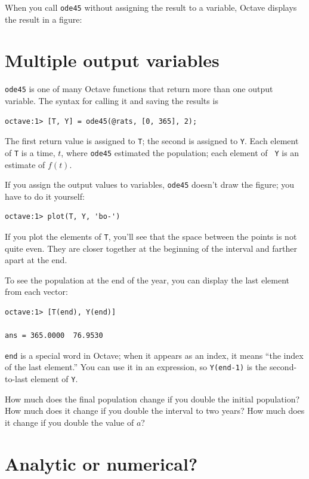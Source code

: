 
When you call {\tt ode45} without assigning the result to a variable,
Octave displays the result in a figure:

\section{Multiple output variables}
\label{rats}

{\tt ode45} is one of many Octave functions that return more
than one output variable. The syntax for calling it and saving
the results is

\begin{verbatim}
octave:1> [T, Y] = ode45(@rats, [0, 365], 2);
\end{verbatim}

The first return value is assigned to {\tt T}; the second is assigned
to {\tt Y}. Each element of {\tt T} is a time,
$t$, where {\tt ode45} estimated the population; each element of {\tt
Y} is an estimate of $f(t)$.

If you assign the output values to variables,
{\tt ode45} doesn't draw the figure;
you have to do it yourself:

\begin{verbatim}
octave:1> plot(T, Y, 'bo-')
\end{verbatim}

If you plot the elements of {\tt T}, you'll see that the
space between the points is not quite even. They are closer
together at the beginning of the interval and farther apart at the end.

To see the population at the end of the year, you can display the
last element from each vector:

\begin{verbatim}
octave:1> [T(end), Y(end)]

ans = 365.0000  76.9530
\end{verbatim}

{\tt end} is a special word in Octave; when it appears as an index,
it means ``the index of the last element.'' You can use it in an
expression, so {\tt Y(end-1)} is the second-to-last element of
{\tt Y}.

How much does the final population change if you double the initial
population? How much does it change if you double the interval
to two years? How much does it change if you double the value
of $a$?


\section{Analytic or numerical?}

